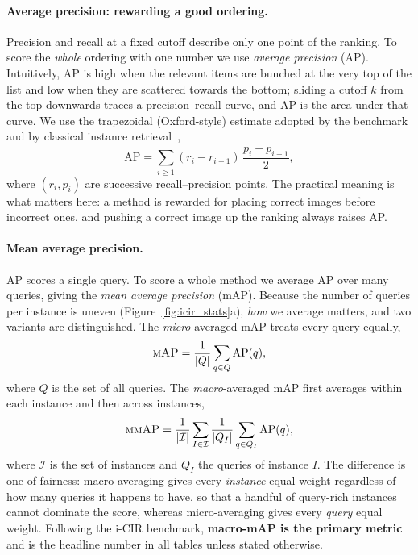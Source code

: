 \paragraph{Average precision: rewarding a good ordering.}
Precision and recall at a fixed cutoff describe only one point of the ranking. To
score the \emph{whole} ordering with one number we use \emph{average precision}
(AP). Intuitively, AP is high when the relevant items are bunched at the very top
of the list and low when they are scattered towards the bottom; sliding a cutoff
$k$ from the top downwards traces a precision--recall curve, and AP is the area
under that curve. We use the trapezoidal (Oxford-style) estimate adopted by the
benchmark and by classical instance retrieval~\cite{philbin2007oxford},
\begin{equation}\label{eq:ap}
    \mathrm{AP} = \sum_{i \geq 1} (r_i - r_{i-1})\,
    \frac{p_i + p_{i-1}}{2},
\end{equation}
where $(r_i, p_i)$ are successive recall--precision points. The practical meaning
is what matters here: a method is rewarded for placing correct images before
incorrect ones, and pushing a correct image up the ranking always raises AP.

\paragraph{Mean average precision.}
AP scores a single query. To score a whole method we average AP over many queries,
giving the \emph{mean average precision} (mAP). Because the number of queries per
instance is uneven (Figure~\ref{fig:icir_stats}a), \emph{how} we average matters,
and two variants are distinguished. The \emph{micro}-averaged mAP treats every
query equally,
\begin{equation}\label{eq:micro_map}
    \textsc{mAP} = \frac{1}{|Q|}\sum_{q\in Q}\mathrm{AP}(q),
\end{equation}
where $Q$ is the set of all queries. The \emph{macro}-averaged mAP first averages
within each instance and then across instances,
\begin{equation}\label{eq:macro_map}
    \textsc{mmAP} = \frac{1}{|\mathcal{I}|}\sum_{I\in\mathcal{I}}
    \frac{1}{|Q_I|}\sum_{q\in Q_I}\mathrm{AP}(q),
\end{equation}
where $\mathcal{I}$ is the set of instances and $Q_I$ the queries of instance $I$.
The difference is one of fairness: macro-averaging gives every \emph{instance}
equal weight regardless of how many queries it happens to have, so that a handful
of query-rich instances cannot dominate the score, whereas micro-averaging gives
every \emph{query} equal weight. Following the i-CIR benchmark,
\textbf{macro-mAP is the primary metric} and is the headline number in all tables
unless stated otherwise.

